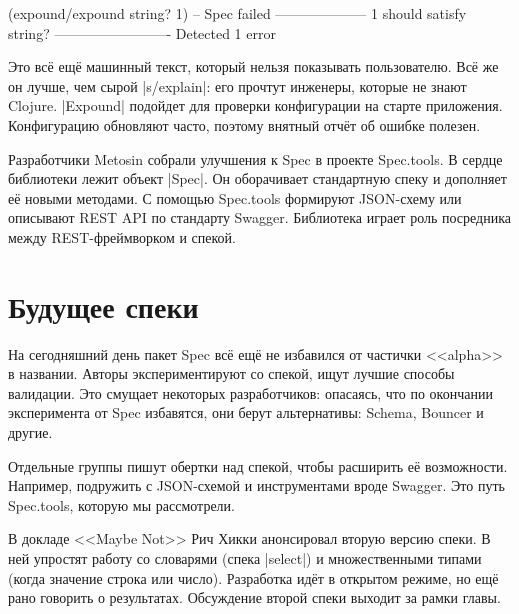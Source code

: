 \begin{english}
  \begin{clojure}
(expound/expound string? 1)
-- Spec failed --------------------
  1
should satisfy
  string?
-------------------------
Detected 1 error
  \end{clojure}
\end{english}


Это вс\"{е} ещ\"{е} машинный текст, который нельзя показывать пользователю. Вс\"{е} же
он лучше, чем сырой \spverb|s/explain|: его прочтут инженеры, которые не знают
Clojure. \spverb|Expound| подойдет для проверки конфигурации на старте
приложения. Конфигурацию обновляют часто, поэтому внятный отч\"{е}т об ошибке
полезен.


Разработчики Metosin собрали улучшения к Spec в проекте
Spec.tools. В сердце библиотеки
лежит объект \spverb|Spec|. Он оборачивает стандартную спеку и дополняет е\"{е}
новыми методами. С помощью Spec.tools формируют JSON-схему или описывают REST
API по стандарту Swagger. Библиотека играет роль посредника между
REST-фреймворком и спекой.

\section{Будущее спеки}


На сегодняшний день пакет Spec вс\"{е} ещ\"{е} не избавился от частички <<alpha>> в
названии. Авторы экспериментируют со спекой, ищут лучшие способы валидации. Это
смущает некоторых разработчиков: опасаясь, что по окончании эксперимента от Spec
избавятся, они берут альтернативы:
Schema,
Bouncer и другие.

Отдельные группы пишут обертки над спекой, чтобы расширить е\"{е}
возможности. Например, подружить с JSON-схемой и инструментами вроде
Swagger. Это путь Spec.tools, которую мы рассмотрели.


В докладе <<Maybe Not>> Рич
Хикки анонсировал вторую версию спеки. В ней упростят работу со словарями (спека
\spverb|select|) и множественными типами (когда значение строка или
число). Разработка ид\"{е}т в открытом режиме, но ещ\"{е} рано говорить о
результатах. Обсуждение второй спеки выходит за рамки главы.

